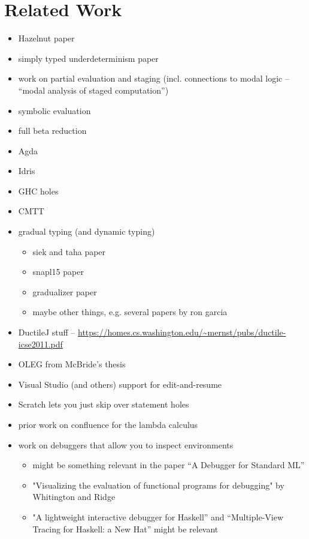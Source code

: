 \newcommand{\relatedWorkSection}{Related Work}
\section{\protect\relatedWorkSection} %
\label{sec:relatedWork}

\begin{itemize}
	\item Hazelnut paper
	\item simply typed underdeterminism paper
	\item work on partial evaluation and staging (incl. connections to modal logic -- ``modal analysis of staged computation'')
	\item symbolic evaluation
	\item full beta reduction
	\item Agda
	\item Idris
	\item GHC holes
	\item CMTT
	\item gradual typing (and dynamic typing)
		\begin{itemize}
			\item siek and taha paper
			\item snapl15 paper
			\item gradualizer paper
			\item maybe other things, e.g. several papers by ron garcia
		\end{itemize}
	\item DuctileJ stuff -- \url{https://homes.cs.washington.edu/~mernst/pubs/ductile-icse2011.pdf}
	\item OLEG from McBride's thesis
	\item Visual Studio (and others) support for edit-and-resume
	\item Scratch lets you just skip over statement holes
	\item prior work on confluence for the lambda calculus
	\item work on debuggers that allow you to inspect environments
		\begin{itemize}
		\item might be something relevant in the paper ``A Debugger for Standard ML'' 
		\item "Visualizing the evaluation of functional programs for debugging" by Whitington and Ridge
		\item "A lightweight interactive debugger for Haskell'' and ``Multiple-View Tracing for Haskell: a New Hat'' might be relevant

\end{itemize}
\end{itemize}
